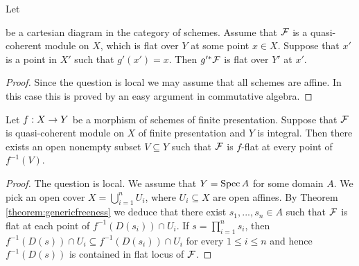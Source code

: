 \begin{proposition}
Let
\begin{center}
\end{center}
be a cartesian diagram in the category of schemes. Assume that ${\mathcal F}$ is a quasi-coherent module on $X$, which is flat over $Y$ at some point $x\in X$. Suppose that $x'$ is a point in $X'$ such that $g'(x')=x$. Then $g'^*{\mathcal F}$ is flat over $Y'$ at $x'$.
\end{proposition}
\begin{proof}
Since the question is local we may assume that all schemes are affine. In this case this is proved by an easy argument in commutative algebra.
\end{proof}

\begin{theorem}\label{theorem:genericflatness}
Let $f:X\rightarrow Y$ be a morphism of schemes of finite presentation. Suppose that ${\mathcal F}$ is quasi-coherent module on $X$ of finite presentation and $Y$ is integral. Then there exists an open nonempty subset $V\subseteq Y$ such that ${\mathcal F}$ is $f$-flat at every point of $f^{-1}(V)$.
\end{theorem}
\begin{proof}
The question is local. We assume that $Y=\mathrm{Spec}\, A$ for some domain $A$. We pick an open cover $X=\bigcup^n_{i=1}U_i$, where $U_i\subseteq X$ are open affines. By Theorem \ref{theorem:genericfreeness} we deduce that there exist $s_1,...,s_n\in A$ such that ${\mathcal F}$ is flat at each point of $f^{-1}\left(D(s_i)\right)\cap U_i$. If $s=\prod^n_{i=1}s_i$, then $f^{-1}\left(D(s)\right)\cap U_i\subseteq f^{-1}\left(D(s_i)\right)\cap U_i$ for every $1\leq i\leq n$ and hence $f^{-1}(D(s))$ is contained in flat locus of ${\mathcal F}$.
\end{proof}

